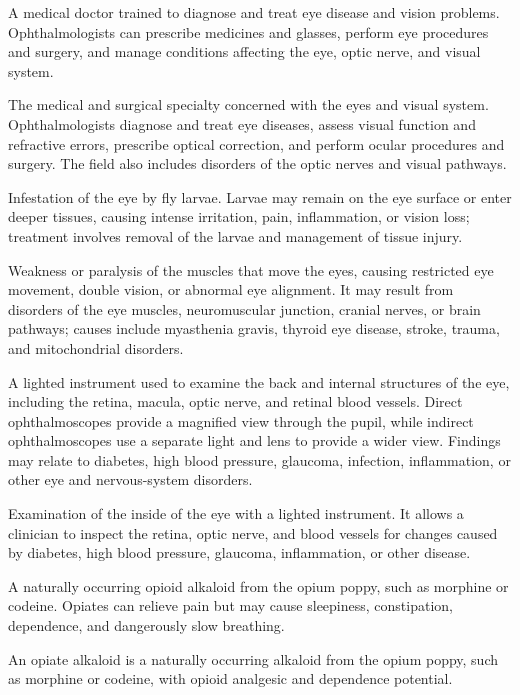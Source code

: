  A medical doctor trained to diagnose and treat eye disease and vision problems. Ophthalmologists can prescribe medicines and glasses, perform eye procedures and surgery, and manage conditions affecting the eye, optic nerve, and visual system.

 The medical and surgical specialty concerned with the eyes and visual system.
Ophthalmologists diagnose and treat eye diseases, assess visual function and refractive
errors, prescribe optical correction, and perform ocular procedures and surgery. The field
also includes disorders of the optic nerves and visual pathways.

 Infestation of the eye by fly larvae. Larvae may remain on the eye surface or enter deeper tissues, causing intense irritation, pain, inflammation, or vision loss; treatment involves removal of the larvae and management of tissue injury.

 Weakness or paralysis of the muscles that move the eyes, causing restricted eye movement, double vision, or abnormal eye alignment. It may result from disorders of the eye muscles, neuromuscular junction, cranial nerves, or brain pathways; causes include myasthenia gravis, thyroid eye disease, stroke, trauma, and mitochondrial disorders.

 A lighted instrument used to examine the back and internal structures of the eye, including the retina, macula, optic nerve, and retinal blood vessels. Direct ophthalmoscopes provide a magnified view through the pupil, while indirect ophthalmoscopes use a separate light and lens to provide a wider view. Findings may relate to diabetes, high blood pressure, glaucoma, infection, inflammation, or other eye and nervous-system disorders.

 Examination of the inside of the eye with a lighted instrument. It allows a clinician to inspect the retina, optic nerve, and blood vessels for changes caused by diabetes, high blood pressure, glaucoma, inflammation, or other disease.

 A naturally occurring opioid alkaloid from the opium poppy, such as morphine or codeine. Opiates can relieve pain but may cause sleepiness, constipation, dependence, and dangerously slow breathing.

 An opiate alkaloid is a naturally occurring alkaloid from the opium poppy, such as morphine or codeine, with opioid analgesic and dependence potential.


